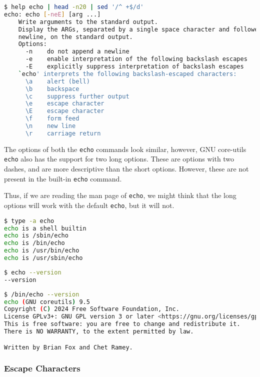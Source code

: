 \begin{lstlisting}[language=bash]
$ help echo | head -n20 | sed '/^ +$/d'
echo: echo [-neE] [arg ...]
    Write arguments to the standard output.
    Display the ARGs, separated by a single space character and followed by a
    newline, on the standard output.
    Options:
      -n	do not append a newline
      -e	enable interpretation of the following backslash escapes
      -E	explicitly suppress interpretation of backslash escapes
    `echo' interprets the following backslash-escaped characters:
      \a	alert (bell)
      \b	backspace
      \c	suppress further output
      \e	escape character
      \E	escape character
      \f	form feed
      \n	new line
      \r	carriage return
\end{lstlisting}

The options of both the \lstinline{echo} commands look similar, however, GNU core-utils \lstinline{echo} also has the support for two long options.
These are options with two dashes, and are more descriptive than the short options.
However, these are not present in the built-in \lstinline{echo} command.

Thus, if we are reading the man page of \lstinline{echo}, we might think that the long options will work with the default \lstinline{echo}, but it will not.

\begin{lstlisting}[language=bash]
$ type -a echo
echo is a shell builtin
echo is /sbin/echo
echo is /bin/echo
echo is /usr/bin/echo
echo is /usr/sbin/echo
\end{lstlisting}
\begin{lstlisting}[language=bash]
$ echo --version
--version
\end{lstlisting}
\begin{lstlisting}[language=bash]
$ /bin/echo --version
echo (GNU coreutils) 9.5
Copyright (C) 2024 Free Software Foundation, Inc.
License GPLv3+: GNU GPL version 3 or later <https://gnu.org/licenses/gpl.html>.
This is free software: you are free to change and redistribute it.
There is NO WARRANTY, to the extent permitted by law.

Written by Brian Fox and Chet Ramey.
\end{lstlisting}

\subsubsection{Escape Characters}


